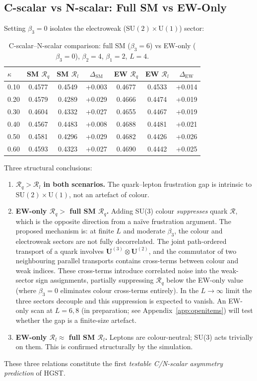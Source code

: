 \documentclass[12pt,a4paper]{article}
\newcommand{\R}{\mathcal{R}}           %
\newcommand{\SU}[1]{\mathrm{SU}(#1)}
\newcommand{\UN}[1]{\mathrm{U}(#1)}
\theoremstyle{plain}
\theoremstyle{definition}
\theoremstyle{remark}
\begin{document}
\subsection{C-scalar vs N-scalar: Full SM vs EW-Only}
\label{sec:sm_qvsl}

Setting $\beta_3=0$ isolates the electroweak ($\SU{2}\times\UN{1}$) sector:

\begin{table}[ht]
\centering
\caption{C-scalar--N-scalar comparison: full SM ($\beta_3=6$) vs EW-only ($\beta_3=0$),
$\beta_2=4$, $\beta_1=2$, $L=4$.}
\label{tab:sm_qvsl}
\begin{tabular}{lcccccc}
\toprule
$\kappa$ & SM $\R_q$ & SM $\R_l$ & $\Delta_\text{SM}$ & EW $\R_q$ & EW $\R_l$ & $\Delta_\text{EW}$ \\
\midrule
0.10 & 0.4577 & 0.4549 & +0.003 & 0.4677 & 0.4533 & +0.014 \\
0.20 & 0.4579 & 0.4289 & +0.029 & 0.4666 & 0.4474 & +0.019 \\
0.30 & 0.4604 & 0.4332 & +0.027 & 0.4655 & 0.4467 & +0.019 \\
0.40 & 0.4567 & 0.4483 & +0.008 & 0.4688 & 0.4481 & +0.021 \\
0.50 & 0.4581 & 0.4296 & +0.029 & 0.4682 & 0.4426 & +0.026 \\
0.60 & 0.4593 & 0.4323 & +0.027 & 0.4690 & 0.4442 & +0.025 \\
\bottomrule
\end{tabular}
\end{table}

Three structural conclusions:
\begin{enumerate}
  \item \textbf{$\R_q>\R_l$ in both scenarios.}
        The quark--lepton frustration gap is intrinsic to $\SU{2}\times\UN{1}$,
        not an artefact of colour.
  \item \textbf{EW-only $\R_q >$ full SM $\R_q$.}
        Adding SU(3) colour \emph{suppresses} quark $\R$, which is the opposite
        direction from a naïve frustration argument.
        The proposed mechanism is: at finite $L$ and moderate $\beta_3$, the
        colour and electroweak sectors are not fully decorrelated.  The joint
        path-ordered transport of a quark involves
        $\mathbf{U}^{(3)}\otimes\mathbf{U}^{(2)}$, and the commutator of two
        neighbouring parallel transports contains cross-terms between colour and
        weak indices.  These cross-terms introduce correlated noise into the
        weak-sector sign assignments, partially suppressing $\R_q$ below the
        EW-only value (where $\beta_3=0$ eliminates colour cross-terms entirely).
        In the $L\to\infty$ limit the three sectors decouple and this suppression
        is expected to vanish.  An EW-only scan at $L=6,8$ (in preparation;
        see Appendix~\ref{app:openitems}) will test whether the gap is a
        finite-size artefact.
  \item \textbf{EW-only $\R_l \approx$ full SM $\R_l$.}
        Leptons are colour-neutral; SU(3) acts trivially on them.
        This is confirmed structurally by the simulation.
\end{enumerate}
These three relations constitute the first \emph{testable C/N-scalar asymmetry
prediction} of HGST.
\end{document}
